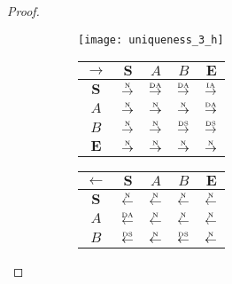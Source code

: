 \begin{proof}
\begin{figure}[htbp]
  \begin{subfigure}{1\textwidth}
    \vspace{1em}
    \centering
    \begin{minipage}[b]{1\textwidth}
      \centering
      \texttt{[image: uniqueness\_3\_h]}
    \end{minipage}
    \begin{minipage}[b]{0.3\textwidth}
      \vspace{1em}
      \centering
      \begin{tabular}{|c|c|c|c|c|} \hline
        $\rightarrow$ & $\bm{S}$ & $A$ & $B$ & $\bm{E}$\\ \hline
        $\bm{S}$ & $\overset{\text{\tiny{N}}}{\rightarrow}$ & $\overset{\text{\tiny{DA}}}{\rightarrow}$ & $\overset{\text{\tiny{DA}}}{\rightarrow}$ & $\overset{\text{\tiny{IA}}}{\rightarrow}$\\ \hline
        $A$ & $\overset{\text{\tiny{N}}}{\rightarrow}$ & $\overset{\text{\tiny{N}}}{\rightarrow}$ & $\overset{\text{\tiny{N}}}{\rightarrow}$ & $\overset{\text{\tiny{DA}}}{\rightarrow}$\\ \hline
        $B$ & $\overset{\text{\tiny{N}}}{\rightarrow}$ & $\overset{\text{\tiny{N}}}{\rightarrow}$ & $\overset{\text{\tiny{DS}}}{\rightarrow}$ & $\overset{\text{\tiny{DS}}}{\rightarrow}$\\ \hline
        $\bm{E}$ & $\overset{\text{\tiny{N}}}{\rightarrow}$ & $\overset{\text{\tiny{N}}}{\rightarrow}$ & $\overset{\text{\tiny{N}}}{\rightarrow}$ & $\overset{\text{\tiny{N}}}{\rightarrow}$\\ \hline
      \end{tabular}
    \end{minipage}
    \begin{minipage}[b]{0.3\textwidth}
      \vspace{1em}
      \centering
      \begin{tabular}{|c|c|c|c|c|} \hline
        $\leftarrow$ & $\bm{S}$ & $A$ & $B$ & $\bm{E}$\\ \hline
        $\bm{S}$ & $\overset{\text{\tiny{N}}}{\leftarrow}$ & $\overset{\text{\tiny{N}}}{\leftarrow}$ & $\overset{\text{\tiny{N}}}{\leftarrow}$ & $\overset{\text{\tiny{N}}}{\leftarrow}$\\ \hline
        $A$ & $\overset{\text{\tiny{DA}}}{\leftarrow}$ & $\overset{\text{\tiny{N}}}{\leftarrow}$ & $\overset{\text{\tiny{N}}}{\leftarrow}$ & $\overset{\text{\tiny{N}}}{\leftarrow}$\\ \hline
        $B$ & $\overset{\text{\tiny{DS}}}{\leftarrow}$ & $\overset{\text{\tiny{N}}}{\leftarrow}$ & $\overset{\text{\tiny{DS}}}{\leftarrow}$ & $\overset{\text{\tiny{N}}}{\leftarrow}$\\ \hline

\end{tabular}
\end{minipage}
\end{subfigure}
\end{figure}
\end{proof}
